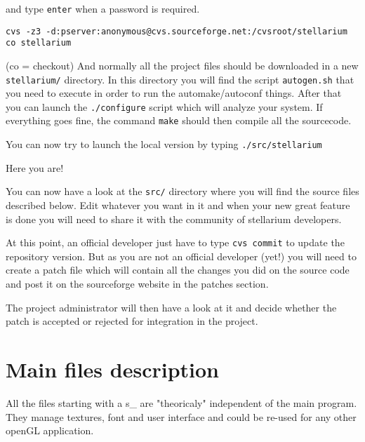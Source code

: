\documentclass[11pt,oneside] {article}
\begin{document}
and type {\tt enter} when a password is required.

{\tt cvs -z3 -d:pserver:anonymous@cvs.sourceforge.net:/cvsroot/stellarium co stellarium}

(co = checkout)
And normally all the project files should be downloaded in a new {\tt stellarium/} directory.
In this directory you will find the script {\tt autogen.sh} that you need to execute in
order to run the automake/autoconf things.
After that you can launch the {\tt ./configure} script which will analyze your system.
If everything goes fine, the command {\tt make} should then compile all the sourcecode.

You can now try to launch the local version by typing {\tt ./src/stellarium}

Here you are!

You can now have a look at the {\tt src/} directory where you will find the source files described below.
Edit whatever you want in it and when your new great feature is done you will need to share it with the community of stellarium developers.

At this point, an official developer just have to type {\tt cvs commit} to update the repository version. But as you are not an official developer (yet!) you will need to create a patch file which will contain all the changes you did on the source code and post it on the sourceforge website in the patches section.

The project administrator will then have a look at it and decide whether the patch is accepted or rejected for integration in the project.

\section{Main files description}
All the files starting with a s\_ are "theoricaly" independent of the main program. They manage textures, font and user interface and could be re-used for any other openGL application.
\end{document}
